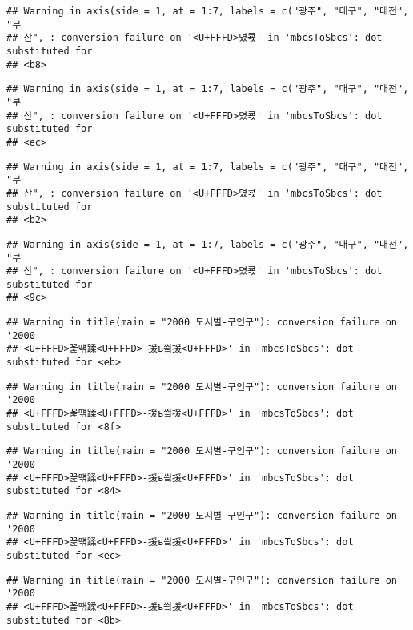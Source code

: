 \documentclass[]{article}
\begin{document}
\begin{verbatim}
## Warning in axis(side = 1, at = 1:7, labels = c("광주", "대구", "대전", "부
## 산", : conversion failure on '<U+FFFD>몄쿇' in 'mbcsToSbcs': dot substituted for
## <b8>
\end{verbatim}

\begin{verbatim}
## Warning in axis(side = 1, at = 1:7, labels = c("광주", "대구", "대전", "부
## 산", : conversion failure on '<U+FFFD>몄쿇' in 'mbcsToSbcs': dot substituted for
## <ec>
\end{verbatim}

\begin{verbatim}
## Warning in axis(side = 1, at = 1:7, labels = c("광주", "대구", "대전", "부
## 산", : conversion failure on '<U+FFFD>몄쿇' in 'mbcsToSbcs': dot substituted for
## <b2>
\end{verbatim}

\begin{verbatim}
## Warning in axis(side = 1, at = 1:7, labels = c("광주", "대구", "대전", "부
## 산", : conversion failure on '<U+FFFD>몄쿇' in 'mbcsToSbcs': dot substituted for
## <9c>
\end{verbatim}

\begin{verbatim}
## Warning in title(main = "2000 도시별-구인구"): conversion failure on '2000
## <U+FFFD>꾩떆蹂<U+FFFD>-援ъ씤援<U+FFFD>' in 'mbcsToSbcs': dot substituted for <eb>
\end{verbatim}

\begin{verbatim}
## Warning in title(main = "2000 도시별-구인구"): conversion failure on '2000
## <U+FFFD>꾩떆蹂<U+FFFD>-援ъ씤援<U+FFFD>' in 'mbcsToSbcs': dot substituted for <8f>
\end{verbatim}

\begin{verbatim}
## Warning in title(main = "2000 도시별-구인구"): conversion failure on '2000
## <U+FFFD>꾩떆蹂<U+FFFD>-援ъ씤援<U+FFFD>' in 'mbcsToSbcs': dot substituted for <84>
\end{verbatim}

\begin{verbatim}
## Warning in title(main = "2000 도시별-구인구"): conversion failure on '2000
## <U+FFFD>꾩떆蹂<U+FFFD>-援ъ씤援<U+FFFD>' in 'mbcsToSbcs': dot substituted for <ec>
\end{verbatim}

\begin{verbatim}
## Warning in title(main = "2000 도시별-구인구"): conversion failure on '2000
## <U+FFFD>꾩떆蹂<U+FFFD>-援ъ씤援<U+FFFD>' in 'mbcsToSbcs': dot substituted for <8b>
\end{verbatim}
\end{document}
